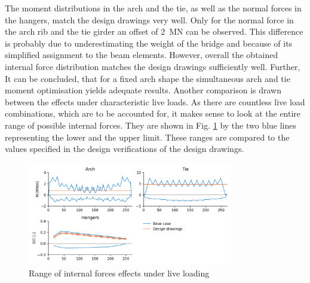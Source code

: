 The moment distributions in the arch and the tie, as well as the normal forces in the hangers, match the design drawings very well. Only for the normal force in the arch rib and the tie girder an offset of \SI{2}{MN} can be observed. This difference is probably due to underestimating the weight of the bridge and because of its simplified assignment to the beam elements. However, overall the obtained internal force distribution matches the design drawings sufficiently well. Further, It can be concluded, that for a fixed arch shape the simultaneous arch and tie moment optimisation yields adequate results. Another comparison is drawn between the effects under characteristic live loads. As there are countless live load combinations, which are to be accounted for, it makes sense to look at the entire range of possible internal forces. They are shown in Fig. \ref{fig:base_case_live} by the two blue lines representing the lower and the upper limit. These ranges are compared to the values specified in the design verifications of the design drawings.

\begin{figure}[H]
    \centering
    \includegraphics[width=0.8\textwidth]{calculations/Base case/Live load.png}
    \caption{Range of internal forces effects under live loading}
    \label{fig:base_case_live}
\end{figure}

